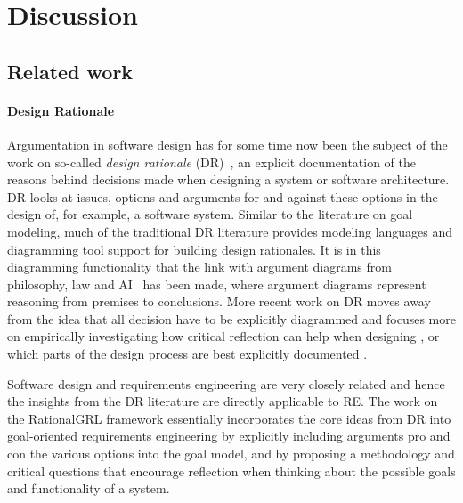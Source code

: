 \section{Discussion}
\label{sect:discussion}

\subsection{Related work}
\label{sect:goalmodeling:relatedwork}

\paragraph{Design Rationale} Argumentation in software design has for some time now been the subject of the work on so-called \emph{design rationale} (DR)~\cite{shum2006hypermedia}, an explicit documentation of the reasons behind decisions made when designing a system or software architecture. DR looks at issues, options and arguments for and against these options in the design of, for example, a software system. Similar to the literature on goal modeling, much of the traditional DR literature provides modeling languages and diagramming tool support for building design rationales. It is in this diagramming functionality that the link with argument diagrams from philosophy, law and AI~\cite{reed2004araucaria,gordon2007visualizing} has been made, where argument diagrams represent reasoning from premises to conclusions. More recent work on DR moves away from the idea that all decision have to be explicitly diagrammed and focuses more on empirically investigating how critical reflection can help when designing \cite{razavian2016two,SchriekEtal2016}, or which parts of the design process are best explicitly documented \cite{falessi2013value}. 

Software design and requirements engineering are very closely related \cite{nuseibeh2001weaving} and hence the insights from the DR literature are directly applicable to RE. The work on the RationalGRL framework essentially incorporates the core ideas from DR into goal-oriented requirements engineering by explicitly including arguments pro and con the various options into the goal model, and by proposing a methodology and critical questions that encourage reflection when thinking about the possible goals and functionality of a system. 

